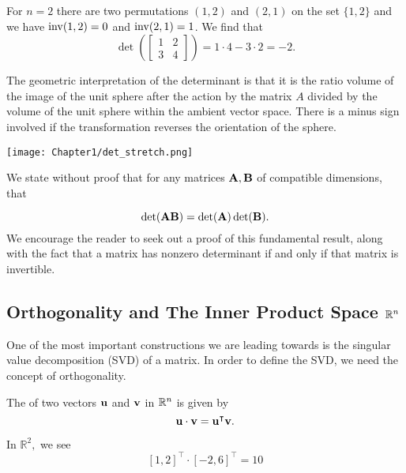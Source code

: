 \begin{example}
For $n=2$ there are two permutations $(1,2)$ and $(2,1)$ on the set $\{1,2\}$ and we have $\inv(1,2) = 0$ and $\inv(2,1) = 1$. We find that
$$\det \left (\begin{bmatrix} 1 & 2 \\
3 & 4 \end{bmatrix} \right )  = 1\cdot4 - 3\cdot2 = -2.$$
\end{example}


\begin{note}
The geometric interpretation of the determinant is that it is the ratio volume of the image of the unit sphere after the action by the matrix $A$ divided by the volume of the unit sphere within the ambient vector space. There is a minus sign involved if the transformation reverses the orientation of the sphere.
\end{note}

 \begin{center}
  \texttt{[image: Chapter1/det\_stretch.png]}
\end{center}

We state without proof that for any matrices $\MA,\MB$ of compatible dimensions, that

\begin{equation}
    \det(\MA\MB) = \det(\MA) \det(\MB).
\end{equation} 
We encourage the reader to seek out a proof of this fundamental result, along with the fact that a matrix has nonzero determinant if and only if that matrix is invertible.

\subsection{Orthogonality and The Inner Product Space \texorpdfstring{$\R^n$}{Rn}}

One of the most important constructions we are leading towards is the singular value decomposition (SVD) of a matrix. In order to define the SVD, we need the concept of orthogonality.

\begin{definition}
The  of two vectors $\vu$ and $\vv$ in $\R^n$ is given by 
$$\vu \cdot \vv = \vu^\intercal \vv.$$
\end{definition}

\begin{example}In $\mathbb R^2,$ we see 
$$[1,2]^\intercal \cdot [-2,6]^\intercal = 10$$
\end{example}

